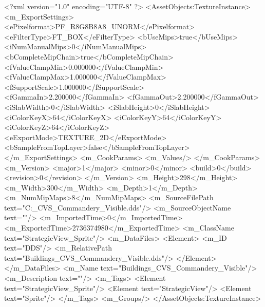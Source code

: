 <?xml version="1.0" encoding="UTF-8" ?>
<AssetObjects:TextureInstance>
	<m_ExportSettings>
		<ePixelformat>PF_R8G8B8A8_UNORM</ePixelformat>
		<eFilterType>FT_BOX</eFilterType>
		<bUseMips>true</bUseMips>
		<iNumManualMips>0</iNumManualMips>
		<bCompleteMipChain>true</bCompleteMipChain>
		<fValueClampMin>0.000000</fValueClampMin>
		<fValueClampMax>1.000000</fValueClampMax>
		<fSupportScale>1.000000</fSupportScale>
		<fGammaIn>2.200000</fGammaIn>
		<fGammaOut>2.200000</fGammaOut>
		<iSlabWidth>0</iSlabWidth>
		<iSlabHeight>0</iSlabHeight>
		<iColorKeyX>64</iColorKeyX>
		<iColorKeyY>64</iColorKeyY>
		<iColorKeyZ>64</iColorKeyZ>
		<eExportMode>TEXTURE_2D</eExportMode>
		<bSampleFromTopLayer>false</bSampleFromTopLayer>
	</m_ExportSettings>
	<m_CookParams>
		<m_Values/>
	</m_CookParams>
	<m_Version>
		<major>1</major>
		<minor>0</minor>
		<build>0</build>
		<revision>0</revision>
	</m_Version>
	<m_Height>298</m_Height>
	<m_Width>300</m_Width>
	<m_Depth>1</m_Depth>
	<m_NumMipMaps>8</m_NumMipMaps>
	<m_SourceFilePath text="C:\Users\Michael\Desktop\Buildings_CVS_Commandery_Visible.dds"/>
	<m_SourceObjectName text=""/>
	<m_ImportedTime>0</m_ImportedTime>
	<m_ExportedTime>2736374980</m_ExportedTime>
	<m_ClassName text="StrategicView_Sprite"/>
	<m_DataFiles>
		<Element>
			<m_ID text="DDS"/>
			<m_RelativePath text="Buildings_CVS_Commandery_Visible.dds"/>
		</Element>
	</m_DataFiles>
	<m_Name text="Buildings_CVS_Commandery_Visible"/>
	<m_Description text=""/>
	<m_Tags>
		<Element text="StrategicView_Sprite"/>
		<Element text="StrategicView"/>
		<Element text="Sprite"/>
	</m_Tags>
	<m_Groups/>
</AssetObjects:TextureInstance>

 
